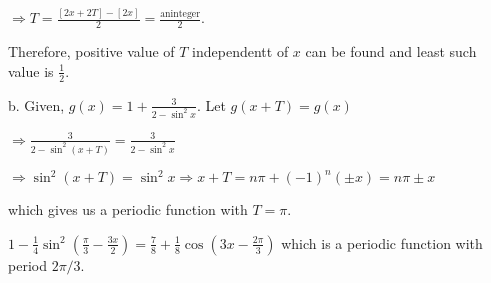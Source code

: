   $\Rightarrow T = \frac{[2x + 2T] - [2x]}{2} = \frac{\mathrm{an integer}}{2}$.

  Therefore, positive value of $T$ independentt of $x$ can be found and least such value is
  $\frac{1}{2}$.

  b. Given, $g(x) = 1 + \frac{3}{2 - \sin^2x}$. Let $g(x + T) = g(x)$

  $\Rightarrow \frac{3}{2 - \sin^2(x + T)} = \frac{3}{2 - \sin^2x}$

  $\Rightarrow \sin^2(x + T) = \sin^2x \Rightarrow x + T = n\pi +(-1)^n(\pm x) = n\pi\pm x$

  which gives us a periodic function with $T = \pi$.

\item $1 - \frac{1}{4}\sin^2\left(\frac{\pi}{3} - \frac{3x}{2}\right) = \frac{7}{8} +
  \frac{1}{8}\cos\left(3x - \frac{2\pi}{3}\right)$ which is a periodic function with period $2\pi/3$.
\stopitemize
